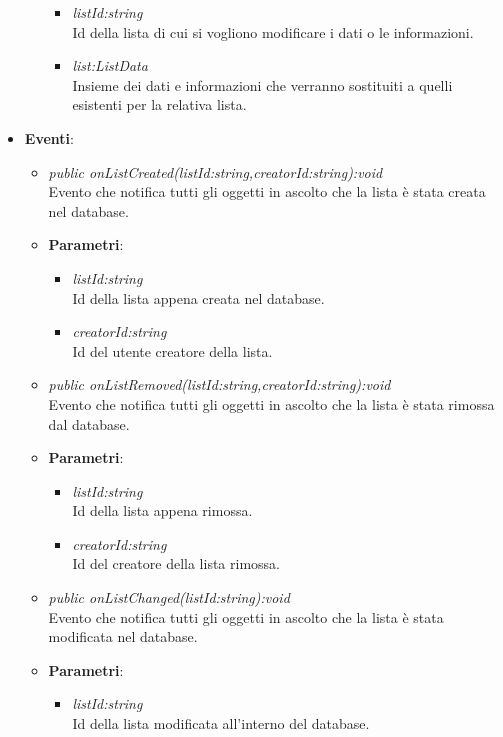 \begin{itemize}
\begin{itemize}
{\begin{itemize}
			\item \textit{listId:string}\\
			Id della lista di cui si vogliono modificare i dati o le informazioni.
			\item \textit{list:ListData}\\
			Insieme dei dati e informazioni che verranno sostituiti a quelli esistenti per la relativa lista.
			\end{itemize}}
	\end{itemize}
\item \textbf{Eventi}:
	\begin{itemize}
	\item \textit{public onListCreated(listId:string,creatorId:string):void}\\
		Evento che notifica tutti gli oggetti in ascolto che la lista è stata creata nel database.
			\item{\textbf{Parametri}: \begin{itemize}
			\item \textit{listId:string}\\
			Id della lista appena creata nel database.
			\item \textit{creatorId:string}\\
			Id del utente creatore della lista.
			\end{itemize}}
	\item \textit{public onListRemoved(listId:string,creatorId:string):void}\\
			Evento che notifica tutti gli oggetti in ascolto che la lista è stata rimossa dal database.
			\item{\textbf{Parametri}: \begin{itemize}
			\item \textit{listId:string}\\
			Id della lista appena rimossa.
			\item \textit{creatorId:string}\\
			Id del creatore della lista rimossa.
			\end{itemize}}
	\item \textit{public onListChanged(listId:string):void}\\
				Evento che notifica tutti gli oggetti in ascolto che la lista è stata modificata nel database.
			\item{\textbf{Parametri}: \begin{itemize}
			\item \textit{listId:string}\\
			Id della lista modificata all'interno del database.
			\end{itemize}}
	\end{itemize}
\end{itemize}

